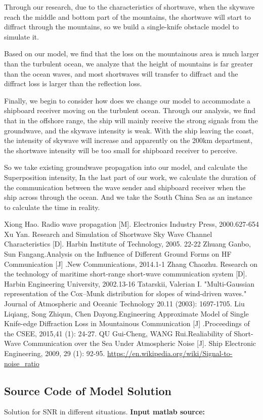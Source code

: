 \documentclass{mcmthesis}
\begin{document}
Through our research, due to the characteristics of shortwave, when the skywave reach the middle and bottom part of the mountains, the shortwave will start to diffract through the mountains, so we build a single-knife obstacle model to simulate it.

Based on our model, we find that the loss on the mountainous area is much larger than the turbulent ocean, we analyze that the height of mountains is far greater than the ocean waves, and most shortwaves will transfer to diffract and the diffract loss is larger than the reflection loss.

Finally, we begin to consider how does we change our model to accommodate a shipboard receiver moving on the turbulent ocean. Through our analysis, we find that in the offshore range, the ship will mainly receive the strong signals from the groundwave, and the skywave intensity is weak. With the ship leaving the coast, the intensity of skywave will increase and apparently on the 200km department, the shortwave intensity will be too small for shipboard receiver to perceive.

 So we take existing groundwave propagation into our model, and calculate the Superposition intensity,
 In the last part of our work, we calculate the duration of the communication between the wave sender and shipboard receiver when the ship across through the ocean. And we take the South China Sea as an instance to calculate the time in reality.
\newpage
\begin{thebibliography}{99}
Xiong Hao. Radio wave propagation [M]. Electronics Industry Press, 2000.627-654
Xu Yan. Research and Simulation of Shortwave Sky Wave Channel Characteristics [D]. Harbin Institute of Technology, 2005. 22-22
Zhuang Ganbo, Sun Fangang.Analysis on the Influence of Different Ground Forms on HF Communication [J] .New Communications, 2014.1-1
Zhang Chaozhu. Research on the technology of maritime short-range short-wave communication system [D]. Harbin Engineering University, 2002.13-16
Tatarskii, Valerian I. "Multi-Gaussian representation of the Cox–Munk distribution for slopes of wind-driven waves." Journal of Atmospheric and Oceanic Technology 20.11 (2003): 1697-1705.
Liu Liqiang, Song Zhiqun, Chen Dayong.Engineering Approximate Model of Single Knife-edge Diffraction Loss in Mountainous Communication [J] .Proceedings of the CSEE, 2015,41 (1): 24-27.
QU Gui-Cheng, WANG Rui.Realiability of Short-Wave Communication over the Sea Under Atmospheric Noise [J]. Ship Electronic Engineering, 2009, 29 (1): 92-95.
\url{https://en.wikipedia.org/wiki/Signal-to-noise_ratio}
\end{thebibliography}
\newpage
\begin{appendices}
\section{Source Code of Model Solution }
Solution for SNR in different situations.
\textbf{\textcolor[rgb]{0.98,0.00,0.00}{Input matlab source:}}

\end{appendices}
\end{document}
